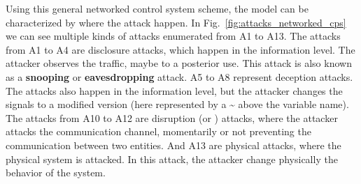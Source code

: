 \documentclass[../main.tex]{subfiles}
\begin{document}
Using this general networked control system scheme, the \DDD{} model can be characterized by where the attack happen.
In Fig.~\ref{fig:attacks_networked_cps} we can see multiple kinds of attacks enumerated from A1 to A13.
The attacks from A1 to A4 are disclosure attacks, which happen in the information level. The attacker observes the traffic, maybe to a posterior use.
This attack is also known as a \textbf{snooping} or \textbf{eavesdropping} attack.
A5 to A8 represent deception attacks.
The attacks also happen in the information level, but the attacker changes the signals to a modified version (here represented by a \~{} above the variable name).
The attacks from A10 to A12 are disruption (or \DoS{}) attacks, where the attacker attacks the communication channel, momentarily or not preventing the communication between two entities.
And A13 are physical attacks, where the physical system is attacked.
In this attack, the attacker change physically the behavior of the system.
\end{document}
